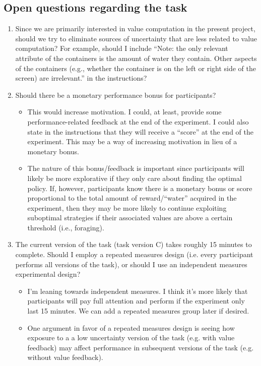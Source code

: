 \documentclass[11pt]{article}
\begin{document}
\subsection{Open questions regarding the task}
\label{sec:org181ee0e}
\begin{enumerate}
\item Since we are primarily interested in value computation in the present project, should we try to eliminate sources of uncertainty that are less related to value computation? For example, should I include ``Note: the only relevant attribute of the containers is the amount of water they contain. Other aspects of the containers (e.g., whether the container is on the left or right side of the screen) are irrelevant.'' in the instructions?
\item Should there be a monetary performance bonus for participants?
\begin{itemize}
\item This would increase motivation. I could, at least, provide some performance-related feedback at the end of the experiment. I could also state in the instructions that they will receive a ``score'' at the end of the experiment. This may be a way of increasing motivation in lieu of a monetary bonus.
\item The nature of this bonus/feedback is important since participants will likely be more explorative if they only care about finding the optimal policy. If, however, participants know there is a monetary bonus or score proportional to the total amount of reward/``water'' acquired in the experiment, then they may be more likely to continue exploiting suboptimal strategies if their associated values are above a certain threshold (i.e., foraging).
\end{itemize}
\item The current version of the task (task version C) takes roughly 15 minutes to complete. Should I employ a repeated measures design (i.e. every participant performs all versions of the task), or should I use an independent measures experimental design?
\begin{itemize}
\item I'm leaning towards independent measures. I think it's more likely that participants will pay full attention and perform if the experiment only last 15 minutes. We can add a repeated measures group later if desired.
\item One argument in favor of a repeated measures design is seeing how exposure to a a low uncertainty version of the task (e.g. with value feedback) may affect performance in subsequent versions of the task (e.g. without value feedback).
\end{itemize}
\end{enumerate}
\end{document}
